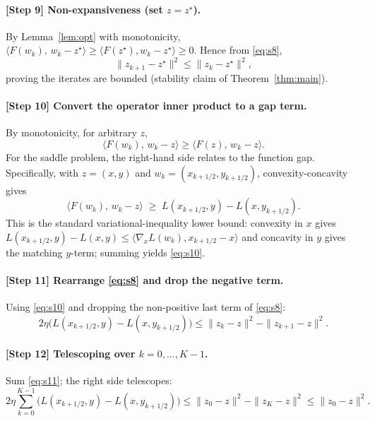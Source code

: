 \documentclass{article}
\begin{document}
\paragraph{[Step 9] Non-expansiveness (set $z=z^\star$).}
By Lemma~\ref{lem:opt} with monotonicity,
$\langle F(w_k),\, w_k - z^\star\rangle \ge \langle F(z^\star), w_k - z^\star\rangle \ge 0$.
Hence from \eqref{eq:s8},
\begin{equation}
\label{eq:s9}
\|z_{k+1}-z^\star\|^2 \le \|z_k - z^\star\|^2,
\end{equation}
proving the iterates are bounded (stability claim of Theorem~\ref{thm:main}).

\paragraph{[Step 10] Convert the operator inner product to a gap term.}
By monotonicity, for arbitrary $z$,
\[
\langle F(w_k),\, w_k - z\rangle \ge \langle F(z),\, w_k - z\rangle.
\]
For the saddle problem, the right-hand side relates to the function gap.
Specifically, with $z=(x,y)$ and $w_k=(x_{k+1/2},y_{k+1/2})$, convexity-concavity gives
\begin{equation}
\label{eq:s10}
\langle F(w_k),\, w_k - z\rangle
\;\ge\; L(x_{k+1/2},y) - L(x, y_{k+1/2}).
\end{equation}
This is the standard variational-inequality lower bound: convexity in $x$
gives $L(x_{k+1/2},y)-L(x,y)\le \langle\nabla_xL(w_k),x_{k+1/2}-x\rangle$
and concavity in $y$ gives the matching $y$-term; summing yields
\eqref{eq:s10}.

\paragraph{[Step 11] Rearrange \eqref{eq:s8} and drop the negative term.}
Using \eqref{eq:s10} and dropping the non-positive last term of
\eqref{eq:s8}:
\begin{equation}
\label{eq:s11}
2\eta\big( L(x_{k+1/2},y) - L(x, y_{k+1/2})\big)
\le \|z_k - z\|^2 - \|z_{k+1}-z\|^2.
\end{equation}

\paragraph{[Step 12] Telescoping over $k=0,\dots,K-1$.}
Sum \eqref{eq:s11}; the right side telescopes:
\begin{equation}
\label{eq:s12}
2\eta \sum_{k=0}^{K-1}\big( L(x_{k+1/2},y) - L(x, y_{k+1/2})\big)
\le \|z_0 - z\|^2 - \|z_K - z\|^2 \le \|z_0 - z\|^2.
\end{equation}
\end{document}
